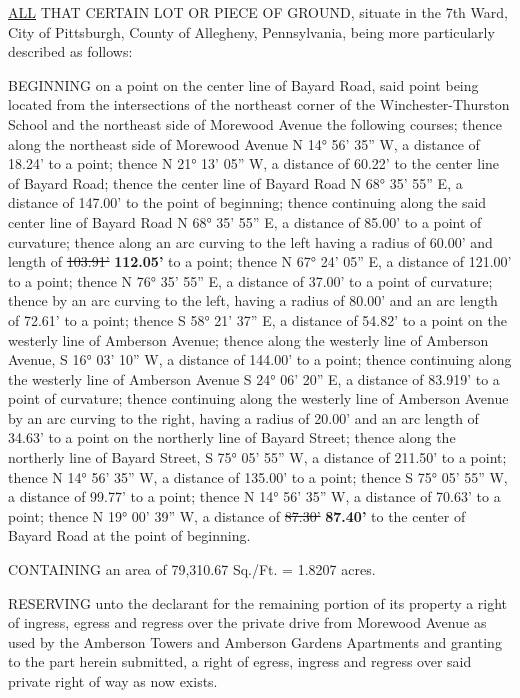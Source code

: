\documentclass[
  14pt,
]{book}
\begin{document}
\protect\hyperlink{ArtII}{ALL} THAT CERTAIN LOT OR PIECE OF GROUND, situate in the 7th Ward, City of Pittsburgh, County of Allegheny, Pennsylvania, being more particularly described as follows:

BEGINNING on a point on the center line of Bayard Road, said point being located from the intersections of the northeast corner of the Winchester-Thurston School and the northeast side of Morewood Avenue the following courses; thence along the northeast side of Morewood Avenue N 14° 56' 35'' W, a distance of 18.24' to a point; thence N 21° 13' 05'' W, a distance of 60.22' to the center line of Bayard Road; thence the center line of Bayard Road N 68° 35' 55'' E, a distance of 147.00' to the point of beginning; thence continuing along the said center line of Bayard Road N 68° 35' 55'' E, a distance of 85.00' to a point of curvature; thence along an arc curving to the left having a radius of 60.00' and length of \sout{103.91'} \textbf{112.05'} to a point; thence N 67° 24' 05'' E, a distance of 121.00' to a point; thence N 76° 35' 55'' E, a distance of 37.00' to a point of curvature; thence by an arc curving to the left, having a radius of 80.00' and an arc length of 72.61' to a point; thence S 58° 21' 37'' E, a distance of 54.82' to a point on the westerly line of Amberson Avenue; thence along the westerly line of Amberson Avenue, S 16° 03' 10'' W, a distance of 144.00' to a point; thence continuing along the westerly line of Amberson Avenue S 24° 06' 20'' E, a distance of 83.919' to a point of curvature; thence continuing along the westerly line of Amberson Avenue by an arc curving to the right, having a radius of 20.00' and an arc length of 34.63' to a point on the northerly line of Bayard Street; thence along the northerly line of Bayard Street, S 75° 05' 55'' W, a distance of 211.50' to a point; thence N 14° 56' 35'' W, a distance of 135.00' to a point; thence S 75° 05' 55'' W, a distance of 99.77' to a point; thence N 14° 56' 35'' W, a distance of 70.63' to a point; thence N 19° 00' 39'' W, a distance of \sout{87.30'} \textbf{87.40'} to the center of Bayard Road at the point of beginning.

CONTAINING an area of 79,310.67 Sq./Ft. = 1.8207 acres.

RESERVING unto the declarant for the remaining portion of its property a right of ingress, egress and regress over the private drive from Morewood Avenue as used by the Amberson Towers and Amberson Gardens Apartments and granting to the part herein submitted, a right of egress, ingress and regress over said private right of way as now exists.
\end{document}
